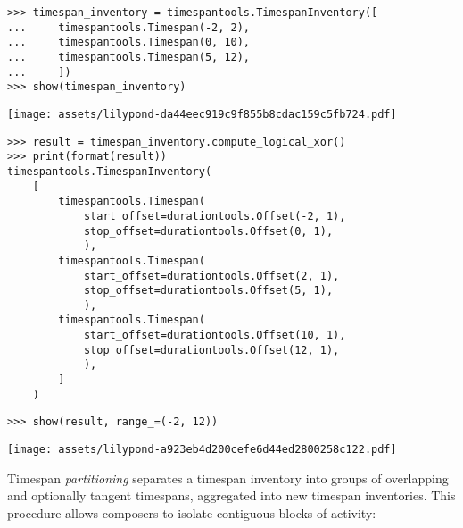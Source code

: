 \begin{abjadbookoutput}
\begin{singlespacing}
\vspace{-0.5\baselineskip}
\begin{verbatim}
>>> timespan_inventory = timespantools.TimespanInventory([
...     timespantools.Timespan(-2, 2),
...     timespantools.Timespan(0, 10),
...     timespantools.Timespan(5, 12),
...     ])
>>> show(timespan_inventory)
\end{verbatim}
\noindent\texttt{[image: assets/lilypond-da44eec919c9f855b8cdac159c5fb724.pdf]}
\begin{verbatim}
>>> result = timespan_inventory.compute_logical_xor()
>>> print(format(result))
timespantools.TimespanInventory(
    [
        timespantools.Timespan(
            start_offset=durationtools.Offset(-2, 1),
            stop_offset=durationtools.Offset(0, 1),
            ),
        timespantools.Timespan(
            start_offset=durationtools.Offset(2, 1),
            stop_offset=durationtools.Offset(5, 1),
            ),
        timespantools.Timespan(
            start_offset=durationtools.Offset(10, 1),
            stop_offset=durationtools.Offset(12, 1),
            ),
        ]
    )
\end{verbatim}
\begin{verbatim}
>>> show(result, range_=(-2, 12))
\end{verbatim}
\noindent\texttt{[image: assets/lilypond-a923eb4d200cefe6d44ed2800258c122.pdf]}
\end{singlespacing}
\end{abjadbookoutput}

\noindent Timespan \emph{partitioning} separates a timespan inventory into
groups of overlapping and optionally tangent timespans, aggregated into new
timespan inventories. This procedure allows composers to isolate contiguous
blocks of activity:

\begin{comment}
<abjad>
timespan_inventory = timespantools.TimespanInventory([
    timespantools.Timespan(0, 10),
    timespantools.Timespan(5, 15),
    timespantools.Timespan(15, 20),
    timespantools.Timespan(25, 30),
    ])
show(timespan_inventory)
for shard in timespan_inventory.partition():
    show(shard, range_=(0, 30))

for shard in timespan_inventory.partition(include_tangent_timespans=True):
    show(shard, range_=(0, 30))

</abjad>
\end{comment}

